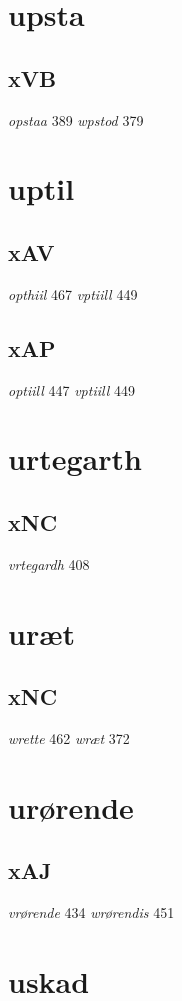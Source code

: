 \documentclass[a4paper,twocolumn]{article}
\begin{document}
\section{upsta}
\label{sec:orgbcf1dae}
\subsection{xVB}
\label{sec:org981ac3c}
\emph{opstaa} 389 \emph{wpstod} 379 
\section{uptil}
\label{sec:org81dba4e}
\subsection{xAV}
\label{sec:org22ad838}
\emph{opthiil} 467 \emph{vptiill} 449 
\subsection{xAP}
\label{sec:org3d09675}
\emph{optiill} 447 \emph{vptiill} 449 
\section{urtegarth}
\label{sec:orgce5c155}
\subsection{xNC}
\label{sec:org3976e13}
\emph{vrtegardh} 408 
\section{uræt}
\label{sec:org9198671}
\subsection{xNC}
\label{sec:org55fdf28}
\emph{wrette} 462 \emph{wræt} 372 
\section{urørende}
\label{sec:org77dbb90}
\subsection{xAJ}
\label{sec:orgfbfc179}
\emph{vrørende} 434 \emph{wrørendis} 451 
\section{uskad}
\label{sec:org68104f4}
\end{document}
